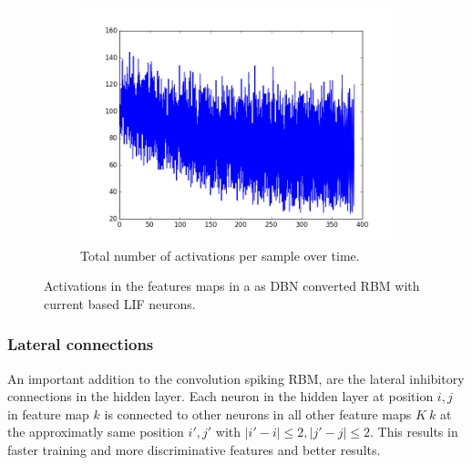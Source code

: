 \begin{figure}[h!]
\begin{subfigure}[t]{.32\textwidth}
	\end{subfigure}
	\begin{subfigure}[t]{.32\textwidth}
  		\centering
  		\includegraphics[width=.9\linewidth]{imgs/reconst/hact.png}
  		\caption{Total number of activations per sample over time.}
  		\label{fig:sub2}
	\end{subfigure}
	\caption{Activations in the features maps in a as DBN converted RBM with current based LIF neurons. }
	\label{fig:stripes}
\end{figure}


\subsubsection{Lateral connections}

An important addition to the convolution spiking RBM, are the lateral inhibitory connections in the hidden layer. 
Each neuron in the hidden layer at position $i,j$ in feature map $k$ is connected to other neurons in all other feature maps $K \ k$ at the approximatly same position $i', j'$ with $ |i'-i| \le 2 , |j' - j| \le 2 $.   
This results in faster training and more discriminative features and better results.

